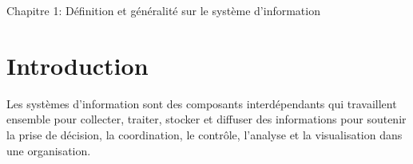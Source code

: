 \documentclass[12pt, letterpaper]{article}
\begin{document}
\begin{center}
    \huge{Chapitre 1: Définition et généralité sur le système d'information}
\end{center}
\section{Introduction}
Les systèmes d'information sont des composants interdépendants qui travaillent
 ensemble pour collecter, traiter, stocker et diffuser des informations pour
  soutenir la prise de décision, la coordination, le contrôle, l'analyse et la
   visualisation dans une organisation.

\section{}
\end{document}
